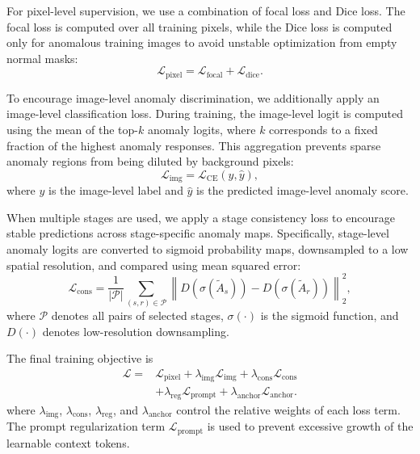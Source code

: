 \documentclass[10pt]{article}
\begin{document}
For pixel-level supervision, we use a combination of focal loss and Dice loss. The focal loss is computed over all training pixels, while the Dice loss is computed only for anomalous training images to avoid unstable optimization from empty normal masks:
\begin{equation}
\mathcal{L}_{\mathrm{pixel}}
=
\mathcal{L}_{\mathrm{focal}}
+
\mathcal{L}_{\mathrm{dice}}.
\label{eq:pixel_loss}
\end{equation}

To encourage image-level anomaly discrimination, we additionally apply an image-level classification loss. During training, the image-level logit is computed using the mean of the top-$k$ anomaly logits, where $k$ corresponds to a fixed fraction of the highest anomaly responses. This aggregation prevents sparse anomaly regions from being diluted by background pixels:
\begin{equation}
\mathcal{L}_{\mathrm{img}}
=
\mathcal{L}_{\mathrm{CE}}(y, \hat{y}),
\label{eq:image_loss}
\end{equation}
where $y$ is the image-level label and $\hat{y}$ is the predicted image-level anomaly score.

When multiple stages are used, we apply a stage consistency loss to encourage stable predictions across stage-specific anomaly maps. Specifically, stage-level anomaly logits are converted to sigmoid probability maps, downsampled to a low spatial resolution, and compared using mean squared error:
\begin{equation}
\mathcal{L}_{\mathrm{cons}}
=
\frac{1}{|\mathcal{P}|}
\sum_{(s,r) \in \mathcal{P}}
\left\|
D(\sigma(\tilde{A}_s)) -
D(\sigma(\tilde{A}_r))
\right\|_2^2,
\label{eq:cons_loss}
\end{equation}
where $\mathcal{P}$ denotes all pairs of selected stages, $\sigma(\cdot)$ is the sigmoid function, and $D(\cdot)$ denotes low-resolution downsampling.

The final training objective is
\begin{equation}
\begin{aligned}
\mathcal{L} =
& \mathcal{L}_{\mathrm{pixel}}
+ \lambda_{\mathrm{img}}\mathcal{L}_{\mathrm{img}}
+ \lambda_{\mathrm{cons}}\mathcal{L}_{\mathrm{cons}} \\
& + \lambda_{\mathrm{reg}}\mathcal{L}_{\mathrm{prompt}}
+ \lambda_{\mathrm{anchor}}\mathcal{L}_{\mathrm{anchor}} .
\end{aligned}
\label{eq:final_loss}
\end{equation}
where $\lambda_{\mathrm{img}}$, $\lambda_{\mathrm{cons}}$, $\lambda_{\mathrm{reg}}$, and $\lambda_{\mathrm{anchor}}$ control the relative weights of each loss term. The prompt regularization term $\mathcal{L}_{\mathrm{prompt}}$ is used to prevent excessive growth of the learnable context tokens.
\end{document}
